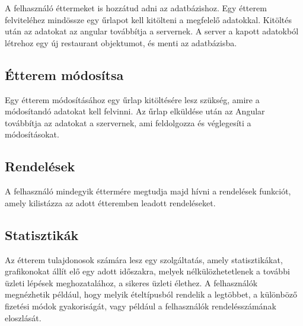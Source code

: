 A felhasználó éttermeket is hozzátud adni az adatbázishoz. Egy étterem felviteléhez mindössze egy űrlapot kell kitölteni a megfelelő adatokkal. Kitöltés után az adatokat az angular továbbítja a servernek. A server a kapott adatokból létrehoz egy új restaurant objektumot, és menti az adatbázisba.

\subsection{Étterem módosítsa}

Egy étterem módosításához egy űrlap kitöltésére lesz szükség, amire a módosítandó adatokat kell felvinni. Az űrlap elküldése után az Angular továbbítja az adatokat a szervernek, ami feldolgozza és véglegesíti a módosításokat.

\subsection{Rendelések}

A felhasználó mindegyik éttermére megtudja majd hívni a rendelések funkciót, amely kilistázza az adott étteremben leadott rendeléseket.

\subsection{Statisztikák}

Az étterem tulajdonosok számára lesz egy szolgáltatás, amely statisztikákat, grafikonokat állít elő egy adott időszakra, melyek nélkülözhetetlenek a további üzleti lépések meghozatalához, a sikeres üzleti élethez. A felhasználók megnézhetik például, hogy melyik ételtípusból rendelik a legtöbbet, a különböző fizetési módok gyakoriságát, vagy például a felhasználók rendelésszámának eloszlását.
